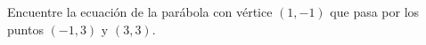 \item Encuentre la ecuación de la parábola con vértice $(1, -1)$ que pasa por los puntos $(-1, 3) \text{ y } (3, 3)$.
